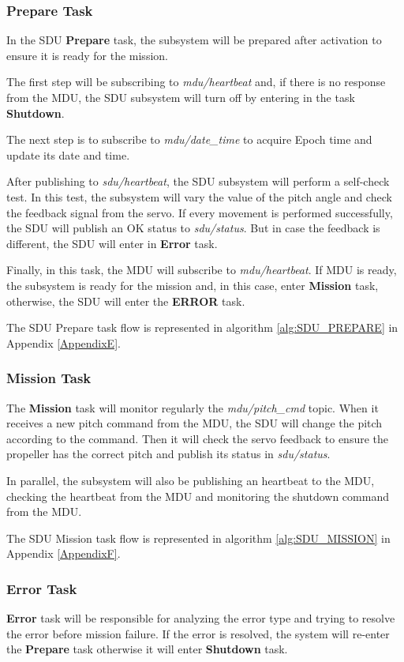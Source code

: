 \subsubsection{Prepare Task}
In the SDU \textbf{Prepare} task, the subsystem will be prepared after activation to ensure it is ready for the mission.

The first step will be subscribing to \textit{mdu\slash heartbeat} and, if there is no response from the MDU, the SDU subsystem will turn off by entering in the task \textbf{Shutdown}.

The next step is to subscribe to \textit{mdu\slash date\_time} to acquire Epoch time and update its date and time.

After publishing to \textit{sdu\slash heartbeat}, the SDU subsystem will perform a self-check test.
In this test, the subsystem will vary the value of the pitch angle and check the feedback signal from the servo.
If every movement is performed successfully, the SDU will publish an OK status to \textit{sdu\slash status}.
But in case the feedback is different, the SDU will enter in \textbf{Error} task.

Finally, in this task, the MDU will subscribe to \textit{mdu\slash heartbeat}.
If MDU is ready, the subsystem is ready for the mission and, in this case, enter \textbf{Mission} task, otherwise, the SDU will enter the \textbf{ERROR} task.

The SDU Prepare task flow is represented in algorithm \ref{alg:SDU_PREPARE} in Appendix \ref{AppendixE}.

\subsubsection{Mission Task}

The \textbf{Mission} task will monitor regularly the \textit{mdu\slash pitch\_cmd} topic.
When it receives a new pitch command from the MDU, the SDU will change the pitch according to the command.
Then it will check the servo feedback to ensure the propeller has the correct pitch and publish its status in \textit{sdu\slash status}.

In parallel, the subsystem will also be publishing an heartbeat to the MDU, checking the heartbeat from the MDU and monitoring the shutdown command from the MDU.

The SDU Mission task flow is represented in algorithm \ref{alg:SDU_MISSION} in Appendix \ref{AppendixF}.

\subsubsection{Error Task}
\textbf{Error} task will be responsible for analyzing the error type and trying to resolve the error before mission failure.
If the error is resolved, the system will re-enter the \textbf{Prepare} task otherwise it will enter \textbf{Shutdown} task.

